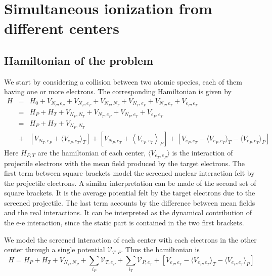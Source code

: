 \chapter{Simultaneous ionization from different centers}

\section{Hamiltonian of the problem}

We start by considering a collision between two atomic species, each of them
having one or more electrons. The corresponding Hamiltonian is given by
\cite{Fiol2001JPBpL503}
\begin{eqnarray}\label{Q:simH1}
H &=& H_{0} + V_{N_{P},e_{P}} + V_{N_{T},e_{T}} +  V_{N_{P},N_{T}} +
V_{N_{T},e_{P}} + V_{N_{P},e_{T}} + V_{e_{P}, e_{T}} \nonumber \\
&=& H_{P} + H_{T} + V_{N_{P},N_{T}} + V_{N_{T},e_{P}} + V_{N_{P},e_{T}} +
V_{e_{P}, e_{T}} \nonumber \\
&=& H_{P} + H_{T} + V_{N_{P},N_{T}}
\\
&+& \left[ V_{N_{T},e_{P}} + \langle V_{e_{P}, e_{T}} \rangle_{T} \right] +
\left[ V_{N_{P},e_{T}} + \left\langle V_{e_{P}, e_{T}} \right\rangle_{P}
\right] + \left[  V_{e_{P}, e_{T}} - \langle  V_{e_{P}, e_{T}} \rangle_{T} -
\langle  V_{e_{P}, e_{T}} \rangle_{P} \right] \nonumber
\end{eqnarray}
Here $H_{P,T}$ are the hamiltonian of each center, $\langle V_{e_{T},e_{P}}
\rangle $  is the interaction of projectile electrons with the mean field
produced by the target electrons. The first term between square brackets
model the screened nuclear interaction felt by the projectile electrons. A
similar interpretation can be made of the second set of square brackets. It
is the average potential felt by the target electrons due to the screened
projectile. The last term accounts by the difference between mean fields and
the real interactions. It can be interpreted as the dynamical contribution of
the e-e interaction, since the static part is contained in the two first
brackets.

We model the screened interaction of each center with each electrons in the
other center through a single potential $\mathcal{V}_{T,P}$. Thus the
hamiltonian is
\[
H = H_{P} + H_{T} + V_{N_{T},N_{P}} + \sum_{i_{P}} \mathcal{V}_{T,e_{P}} +
\sum_{i_{T}} \mathcal{V}_{P,e_{T}} + \left[  V_{e_{P}, e_{T}} - \langle
V_{e_{P}, e_{T}} \rangle_{T} - \langle  V_{e_{P}, e_{T}} \rangle_{P} \right]
\]

